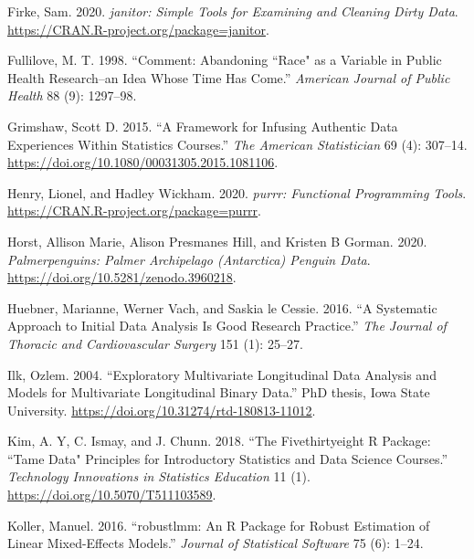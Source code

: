\documentclass{article}
\newlength{\cslhangindent}
\newlength{\cslentryspacingunit} %
\newenvironment{CSLReferences}[2] %
 {%
  \setlength{\parindent}{0pt}
  \ifodd #1
  \let\oldpar\par
  \def\par{\hangindent=\cslhangindent\oldpar}
  \fi
  \setlength{\parskip}{#2\cslentryspacingunit}
 }%
 {}
\begin{document}
\begin{CSLReferences}{1}{0}
\leavevmode{}%
Firke, Sam. 2020. \emph{{janitor: Simple Tools for Examining and Cleaning Dirty Data}}. \url{https://CRAN.R-project.org/package=janitor}.

\leavevmode{}%
Fullilove, M. T. 1998. {``Comment: Abandoning ``Race" as a Variable in Public Health Research--an Idea Whose Time Has Come.''} \emph{American Journal of Public Health} 88 (9): 1297--98.

\leavevmode{}%
Grimshaw, Scott D. 2015. {``A Framework for Infusing Authentic Data Experiences Within Statistics Courses.''} \emph{The American Statistician} 69 (4): 307--14. \url{https://doi.org/10.1080/00031305.2015.1081106}.

\leavevmode{}%
Henry, Lionel, and Hadley Wickham. 2020. \emph{{purrr: Functional Programming Tools}}. \url{https://CRAN.R-project.org/package=purrr}.

\leavevmode{}%
Horst, Allison Marie, Alison Presmanes Hill, and Kristen B Gorman. 2020. \emph{Palmerpenguins: Palmer Archipelago (Antarctica) Penguin Data}. \url{https://doi.org/10.5281/zenodo.3960218}.

\leavevmode{}%
Huebner, Marianne, Werner Vach, and Saskia le Cessie. 2016. {``A Systematic Approach to Initial Data Analysis Is Good Research Practice.''} \emph{The Journal of Thoracic and Cardiovascular Surgery} 151 (1): 25--27.

\leavevmode{}%
Ilk, Ozlem. 2004. {``Exploratory Multivariate Longitudinal Data Analysis and Models for Multivariate Longitudinal Binary Data.''} PhD thesis, Iowa State University. \url{https://doi.org/10.31274/rtd-180813-11012}.

\leavevmode{}%
Kim, A. Y, C. Ismay, and J. Chunn. 2018. {``The Fivethirtyeight {R} Package: ``Tame Data" Principles for Introductory Statistics and Data Science Courses.''} \emph{Technology Innovations in Statistics Education} 11 (1). \url{https://doi.org/10.5070/T511103589}.

\leavevmode{}%
Koller, Manuel. 2016. {``{robustlmm: An R Package for Robust Estimation of Linear Mixed-Effects Models}.''} \emph{Journal of Statistical Software} 75 (6): 1--24.


\end{CSLReferences}
\end{document}
